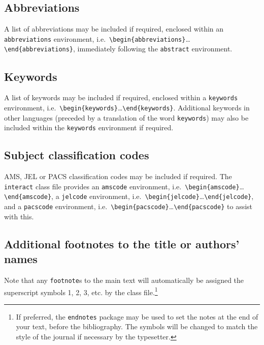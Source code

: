\documentclass[]{interact}
\theoremstyle{plain}%
\theoremstyle{definition}
\theoremstyle{remark}
\begin{document}
\hypertarget{abbreviations}{%
\subsection{Abbreviations}\label{abbreviations}}

A list of abbreviations may be included if required, enclosed within an \texttt{abbreviations} environment, i.e.~\texttt{\textbackslash{}begin\{abbreviations\}}\ldots\texttt{\textbackslash{}end\{abbreviations\}}, immediately following the \texttt{abstract} environment.

\hypertarget{keywords}{%
\subsection{Keywords}\label{keywords}}

A list of keywords may be included if required, enclosed within a \texttt{keywords} environment, i.e.~\texttt{\textbackslash{}begin\{keywords\}}\ldots\texttt{\textbackslash{}end\{keywords\}}. Additional keywords in other languages (preceded by a translation of the word \texttt{keywords}) may also be included within the \texttt{keywords} environment if required.

\hypertarget{subject-classification-codes}{%
\subsection{Subject classification codes}\label{subject-classification-codes}}

AMS, JEL or PACS classification codes may be included if required. The \texttt{interact} class file provides an \texttt{amscode} environment, i.e.~\texttt{\textbackslash{}begin\{amscode\}}\ldots\texttt{\textbackslash{}end\{amscode\}}, a \texttt{jelcode} environment, i.e.~\texttt{\textbackslash{}begin\{jelcode\}}\ldots\texttt{\textbackslash{}end\{jelcode\}}, and a \texttt{pacscode} environment, i.e.~\texttt{\textbackslash{}begin\{pacscode\}}\ldots\texttt{\textbackslash{}end\{pacscode\}} to assist with this.

\hypertarget{additional-footnotes-to-the-title-or-authors-names}{%
\subsection{Additional footnotes to the title or authors' names}\label{additional-footnotes-to-the-title-or-authors-names}}

Note that any \texttt{footnote}s to the main text will automatically be assigned the superscript symbols 1, 2, 3, etc. by the class file.\footnote{If preferred, the \texttt{endnotes} package may be used to set the notes at the end of your text, before the bibliography. The symbols will be changed to match the style of the journal if necessary by the typesetter.}
\end{document}

